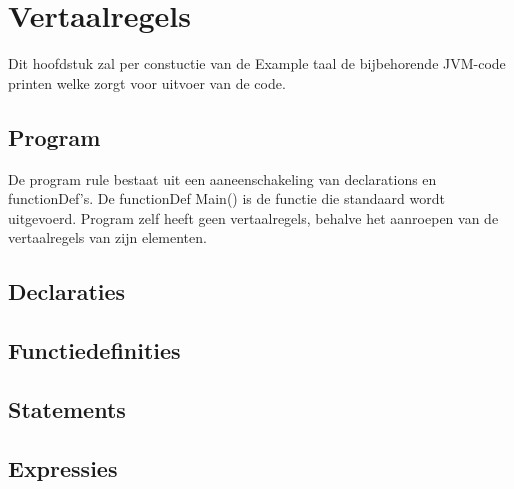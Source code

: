 \chapter{Vertaalregels}
Dit hoofdstuk zal per constuctie van de Example taal de bijbehorende JVM-code printen welke zorgt voor uitvoer van de code.

\section{Program}
De program rule bestaat uit een aaneenschakeling van declarations en functionDef's. De functionDef Main() is de functie die standaard wordt uitgevoerd. Program zelf heeft geen vertaalregels, behalve het aanroepen van de vertaalregels van zijn elementen. 

\section{Declaraties}

\section{Functiedefinities}
\section{Statements}
\section{Expressies}
